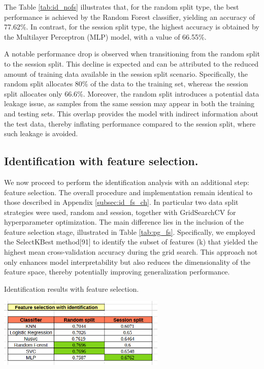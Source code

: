 \documentclass[12pt]{report}
\begin{document}
The Table \ref{tab:id_nofs} illustrates that, for the random split type, the best performance is achieved by the Random Forest classifier, yielding an accuracy of 77.62\%.
In contrast, for the session split type, the highest accuracy is obtained by the Multilayer Perceptron (MLP) model, with a value of 66.55\%.

A notable performance drop is observed when transitioning from the random split to the session split. 
This decline is expected and can be attributed to the reduced amount of training data available in the session split scenario. 
Specifically, the random split allocates 80\% of the data to the training set, whereas the session split allocates only 66.6\%.
Moreover, the random split introduces a potential data leakage issue, as samples from the same session may appear in both the training and testing sets. 
This overlap provides the model with indirect information about the test data, thereby inflating performance compared to the session split, where such leakage is avoided.
\FloatBarrier

\subsection{Identification with feature selection.}

We now proceed to perform the identification analysis with an additional step: feature selection.
The overall procedure and implementation remain identical to those described in Appendix \ref{subsec:id_fs_ch}.
In particular two data split strategies were used, random and session, together with GridSearchCV for hyperparameter optimization.
The main difference lies in the inclusion of the feature selection stage, illustrated in Table \ref{tab:pg_fs}. 
Specifically, we employed the SelectKBest method[91] to identify the subset of features (k) that yielded the highest mean cross-validation accuracy during the grid search.
This approach not only enhances model interpretability but also reduces the dimensionality of the feature space, thereby potentially improving generalization performance.

\begin{table}[ht]
    \centering
    \caption{Identification results with feature selection.}
    \includegraphics[width=0.6\textwidth]{Images/Results/Identification/fs.png}
    \label{tab:id_fs}
\end{table}
\end{document}
